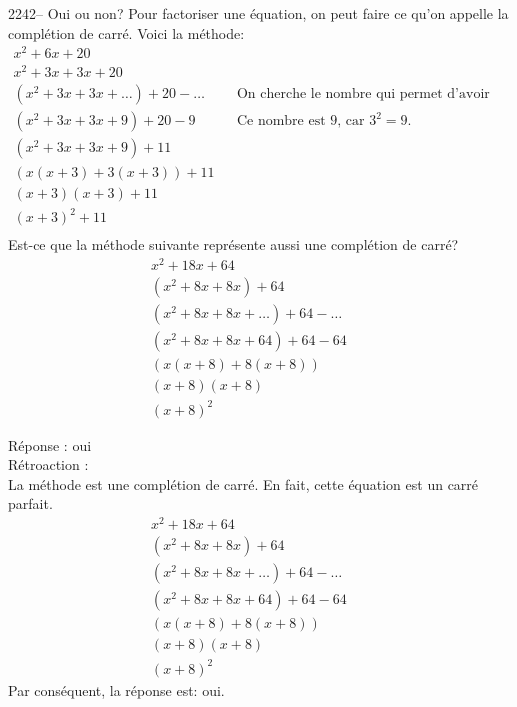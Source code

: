 \documentclass[letterpaper, 12pt]{article}
\begin{document}



2242-- Oui ou non? Pour factoriser une \'equation, on peut faire ce qu'on appelle la compl\'etion de carr\'e. Voici la m\'ethode:
\begin{eqnarray*}
x^{2}+6x+20 & & \\
 x^{2}+3x+3x+20 & & \\
(x^{2}+3x+3x+\ldots)+20-\ldots & & \textrm{On cherche le nombre qui permet d'avoir un trin\^ome carr\'e parfait.}\\
(x^{2}+3x+3x+9)+20-9& & \textrm{Ce nombre est 9, car $3^{2}=9$.} \\
(x^{2}+3x+3x+9)+11 & & \\
(x(x+3)+3(x+3))+11 & & \\
(x+3)(x+3)+11 & & \\
(x+3)^{2}+11 & & \\
\end{eqnarray*}
Est-ce que la m\'ethode suivante repr\'esente aussi une compl\'etion de carr\'e?
\begin{eqnarray*}
x^{2}+18x+64 & & \\
 (x^{2}+8x+8x)+64 & & \\
 (x^{2}+8x+8x+\ldots)+64-\ldots & & \\
 (x^{2}+8x+8x+64)+64-64 & & \\
 (x(x+8)+8(x+8))& & \\
(x+8)(x+8)& &\\
(x+8)^{2}
\end{eqnarray*}

R\'eponse : oui\\

R\'etroaction :\\
La m\'ethode est une compl\'etion de carr\'e. En fait, cette \'equation est un carr\'e parfait.
\begin{eqnarray*}
x^{2}+18x+64 & & \\
 (x^{2}+8x+8x)+64 & & \\
 (x^{2}+8x+8x+\ldots)+64-\ldots & & \\
 (x^{2}+8x+8x+64)+64-64 & & \\
 (x(x+8)+8(x+8))& & \\
(x+8)(x+8)& &\\
(x+8)^{2}
\end{eqnarray*}
Par cons\'equent, la r\'eponse est: oui.\\
\end{document}
